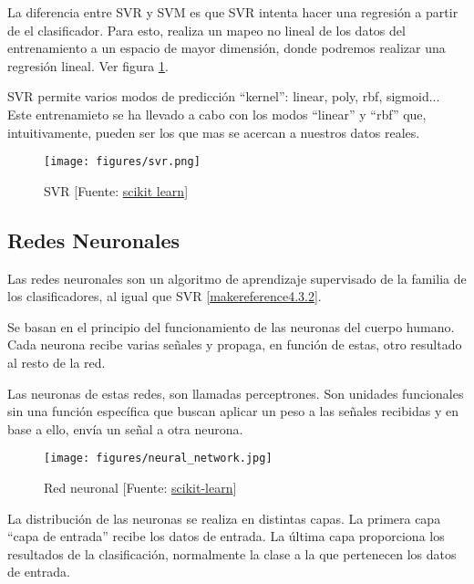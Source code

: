 	La diferencia entre SVR y SVM es que SVR intenta hacer una regresión a partir de el clasificador. Para esto, realiza un mapeo no lineal de los datos del entrenamiento a un espacio de mayor dimensión, donde podremos realizar una regresión lineal. Ver figura \ref{svr}.

	SVR permite varios modos de predicción ``kernel'': linear, poly, rbf, sigmoid...
	Este entrenamieto se ha llevado a cabo con los modos ``linear'' y ``rbf'' que, intuitivamente, pueden ser los que mas se acercan a nuestros datos reales.

	\begin{figure}[htb]
		\begin{center}
			\texttt{[image: figures/svr.png]}
			\caption{SVR [Fuente: \href{http://scikit-learn.org/stable/auto_examples/svm/plot_svm_regression.html}{scikit learn}] \label{svr}}
		\end{center}
	\end{figure}
	
	\subsection{Redes Neuronales}
	\label{makereference4.3.3}
	Las redes neuronales son un algoritmo de aprendizaje supervisado de la familia de los clasificadores, al igual que SVR \ref{makereference4.3.2}.

	Se basan en el principio del funcionamiento de las neuronas del cuerpo humano. Cada neurona recibe varias señales y propaga, en función de estas, otro resultado al resto de la red.

	Las neuronas de estas redes, son llamadas perceptrones. Son unidades funcionales sin una función específica que buscan aplicar un peso a las señales recibidas y en base a ello, envía un señal a otra neurona.

	\begin{figure}[htb]
		\begin{center}
			\texttt{[image: figures/neural\_network.jpg]}
			\caption{Red neuronal [Fuente: \href{www.scikit-learn.org}{scikit-learn}] \label{network}}
		\end{center}
	\end{figure}

	La distribución de las neuronas se realiza en distintas capas. La primera capa ``capa de entrada'' recibe los datos de entrada. La última capa proporciona los resultados de la clasificación, normalmente la clase a la que pertenecen los datos de entrada.

